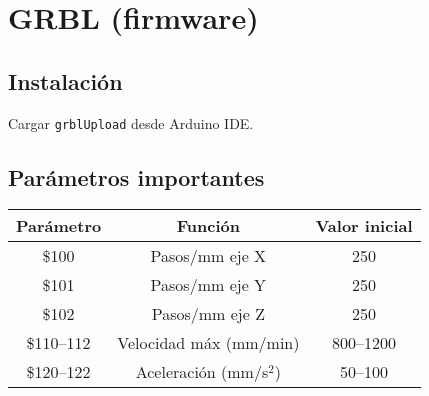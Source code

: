 \chapter{GRBL (firmware)}
\label{ch:grbl}
\section*{Instalación}
Cargar \texttt{grblUpload} desde Arduino IDE.

\section*{Parámetros importantes}
\begin{center}
\begin{tabular}{|c|c|c|}
\hline
\textbf{Parámetro} & \textbf{Función} & \textbf{Valor inicial} \\
\hline
\$100 & Pasos/mm eje X & 250 \\
\$101 & Pasos/mm eje Y & 250 \\
\$102 & Pasos/mm eje Z & 250 \\
\$110–112 & Velocidad máx (mm/min) & 800–1200 \\
\$120–122 & Aceleración (mm/s$^2$) & 50–100 \\
\hline
\end{tabular}
\end{center}

